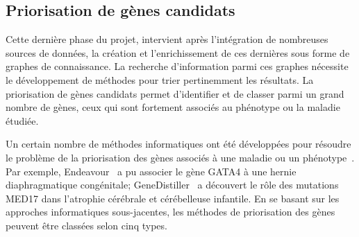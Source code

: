 \subsection{Priorisation de gènes candidats}


Cette dernière phase du projet, intervient après l’intégration de nombreuses sources de données, la création et l’enrichissement de ces dernières sous forme de graphes de connaissance. La recherche d’information parmi ces graphes nécessite le développement de méthodes pour trier pertinemment les résultats.  La priorisation de gènes candidats permet d’identifier et de classer parmi un grand nombre de gènes, ceux qui sont fortement associés au phénotype ou la maladie étudiée. 

Un certain nombre de méthodes informatiques ont été développées pour résoudre le problème de la priorisation des gènes associés à une maladie ou un phénotype~\cite{Moreau2012}. Par exemple, Endeavour~\cite{Moreau2012,Tranchevent2016a} a pu associer le gène GATA4 à une hernie diaphragmatique congénitale; GeneDistiller~\cite{genedistiller} a découvert le rôle des mutations MED17 dans l'atrophie cérébrale et cérébelleuse infantile. En se basant sur les approches informatiques sous-jacentes, les méthodes de priorisation des gènes peuvent être classées selon cinq types.\\

